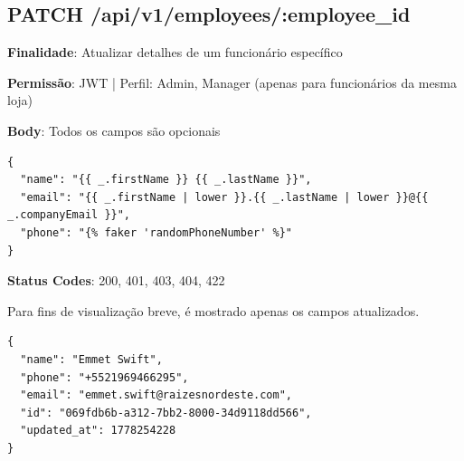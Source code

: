 \subsection{PATCH /api/v1/employees/:employee\_id}

\noindent\textbf{Finalidade}: Atualizar detalhes de um funcionário específico

\noindent\textbf{Permissão}: JWT | Perfil: Admin, Manager (apenas para funcionários da mesma loja)

\noindent\textbf{Body}: Todos os campos são opcionais

\vspace{-0.2cm}

\begin{verbatim}
{
  "name": "{{ _.firstName }} {{ _.lastName }}",
  "email": "{{ _.firstName | lower }}.{{ _.lastName | lower }}@{{ _.companyEmail }}",
  "phone": "{% faker 'randomPhoneNumber' %}"
}
\end{verbatim}

\noindent\textbf{Status Codes}: 200, 401, 403, 404, 422

\begin{tcolorbox}[colback=green!5, colframe=black, title=\textbf{200 OK}]
Para fins de visualização breve, é mostrado apenas os campos atualizados.
\begin{verbatim}
{
  "name": "Emmet Swift",
  "phone": "+5521969466295",
  "email": "emmet.swift@raizesnordeste.com",
  "id": "069fdb6b-a312-7bb2-8000-34d9118dd566",
  "updated_at": 1778254228
}
\end{verbatim}
\end{tcolorbox}
